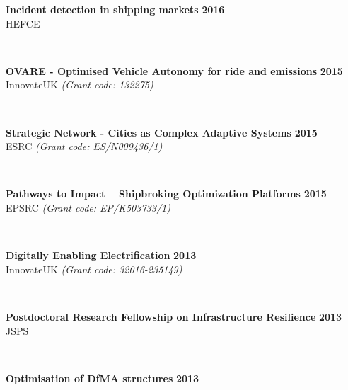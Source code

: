\documentclass[margin]{res}
\newcommand\tab[1][1cm]{\hspace*{#1}}
\begin{document}
\begin{resume}
\begin{minipage}{\textwidth}
	{\bf Incident detection in shipping markets} \hfill {\bf 2016} \\
	\tab[0.2in] 
	\quad HEFCE
	\end{minipage}
	\\
	\vspace{0.03in}
	\begin{minipage}{\textwidth}
	{\bf OVARE - Optimised Vehicle Autonomy for ride and emissions} \hfill {\bf 2015} \\
	\tab[0.2in] 
	\quad InnovateUK
	\textit{(Grant code: 132275)}
	\end{minipage}
	\\
	\vspace{0.03in}
	\begin{minipage}{\textwidth}
	{\bf Strategic Network - Cities as Complex Adaptive Systems} \hfill {\bf 2015} \\
	\tab[0.2in] 
	\quad ESRC
	\textit{(Grant code: ES/N009436/1)}
	\end{minipage}
	\\
	\vspace{0.03in}
	\begin{minipage}{\textwidth}
	{\bf Pathways to Impact – Shipbroking Optimization Platforms} \hfill {\bf 2015} \\
	\tab[0.2in] 
	\quad EPSRC
	\textit{(Grant code: EP/K503733/1)}
	\end{minipage}
	\\
	\vspace{0.03in}
	\begin{minipage}{\textwidth}
	{\bf Digitally Enabling Electrification} \hfill {\bf 2013} \\
	\tab[0.2in] 
	\quad InnovateUK
	\textit{(Grant code: 32016-235149)}
	\end{minipage}
	\\
	\vspace{0.03in}
	\begin{minipage}{\textwidth}
	{\bf Postdoctoral Research Fellowship on Infrastructure Resilience} \hfill {\bf 2013} \\
	\tab[0.2in] 
	\quad JSPS
	\end{minipage}
	\\
	\vspace{0.03in}
	\begin{minipage}{\textwidth}
	{\bf Optimisation of DfMA structures} \hfill {\bf 2013} \\

\end{minipage}
\end{resume}
\end{document}

